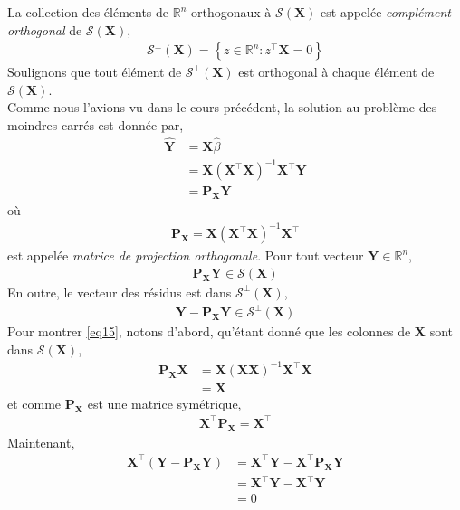 La collection des éléments de $\mathbb{R}^n$ orthogonaux à $\mathcal{S}(\mathbf{X})$ est appelée \emph{complément orthogonal} de $\mathcal{S}(\mathbf{X})$,
\begin{align*}
\mathcal{S}^\perp(\mathbf{X}) = \left\{z \in \mathbb{R}^n: z^\top\mathbf{X}=0\right\}
\end{align*}
Soulignons que tout élément de $\mathcal{S}^\perp(\mathbf{X})$ est orthogonal à chaque élément de $\mathcal{S}(\mathbf{X})$.\\
Comme nous l'avions vu dans le cours précédent, la solution au problème des moindres carrés est donnée par,
\begin{align*}
\widehat{\mathbf{Y}} &= \mathbf{X}\widehat{\beta}\\
&=\mathbf{X}(\mathbf{X}^\top\mathbf{X})^{-1}\mathbf{X}^\top\mathbf{Y}\\
&=\mathbf{P}_{\mathbf{X}}\mathbf{Y}
\end{align*}
où 
\begin{align*} \mathbf{P}_{\mathbf{X}} = \mathbf{X}(\mathbf{X}^\top\mathbf{X})^{-1}\mathbf{X}^\top
\end{align*}
est appelée \emph{matrice de projection orthogonale}. Pour tout vecteur $\mathbf{Y}\in\mathbb{R}^n$,
\begin{align*}
\mathbf{P}_{\mathbf{X}}\mathbf{Y} \in \mathcal{S}(\mathbf{X})
\end{align*}
En outre, le vecteur des résidus est dans  $\mathcal{S}^\perp(\mathbf{X})$,
\begin{align}
\mathbf{Y} - \mathbf{P}_{\mathbf{X}}\mathbf{Y} \in \mathcal{S}^\perp(\mathbf{X})
\label{eq15}
\end{align}
Pour montrer \eqref{eq15}, notons d'abord, qu'étant donné que les colonnes de $\mathbf{X}$ sont dans $\mathcal{S}(\mathbf{X})$,
\begin{align*}
\mathbf{P}_\mathbf{X}\mathbf{X} &= \mathbf{X}(\mathbf{X}\mathbf{X})^{-1}\mathbf{X}^\top\mathbf{X}\\
&=\mathbf{X}
\end{align*}
et comme $\mathbf{P}_\mathbf{X}$ est une matrice symétrique,
\begin{align*}
\mathbf{X}^\top\mathbf{P}_\mathbf{X} = \mathbf{X}^\top
\end{align*}
Maintenant,
\begin{align*}
\mathbf{X}^\top(\mathbf{Y} - \mathbf{P}_\mathbf{X}\mathbf{Y}) &= \mathbf{X}^\top\mathbf{Y}-\mathbf{X}^\top\mathbf{P}_\mathbf{X}\mathbf{Y}\\
& = \mathbf{X}^\top\mathbf{Y}-\mathbf{X}^\top\mathbf{Y}\\
&=0 
\end{align*}
